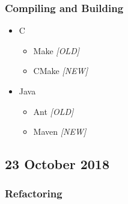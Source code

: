 \documentclass[a4paper]{article}
\providecommand{\tightlist}{%
  \setlength{\itemsep}{0pt}\setlength{\parskip}{0pt}}
\begin{document}
\hypertarget{compiling-and-building}{%
\subsubsection{Compiling and Building}\label{compiling-and-building}}

\begin{itemize}
\item
  C

  \begin{itemize}
  \tightlist
  \item
    Make \emph{{[}OLD{]}}
  \item
    CMake \emph{{[}NEW{]}}
  \end{itemize}
\item
  Java

  \begin{itemize}
  \tightlist
  \item
    Ant \emph{{[}OLD{]}}
  \item
    Maven \emph{{[}NEW{]}}
  \end{itemize}
\end{itemize}

\hypertarget{23-october-2018}{%
\subsection{23 October 2018}\label{23-october-2018}}

\hypertarget{refactoring}{%
\subsubsection{Refactoring}\label{refactoring}}
\end{document}
